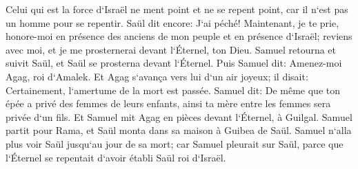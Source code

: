 \verse Celui qui est la force d`Israël ne ment point et ne se repent point, car il n`est pas un homme pour se repentir. 
\verse Saül dit encore: J`ai péché! Maintenant, je te prie, honore-moi en présence des anciens de mon peuple et en présence d`Israël; reviens avec moi, et je me prosternerai devant l`Éternel, ton Dieu. 
\verse Samuel retourna et suivit Saül, et Saül se prosterna devant l`Éternel. 
\verse Puis Samuel dit: Amenez-moi Agag, roi d`Amalek. Et Agag s`avança vers lui d`un air joyeux; il disait: Certainement, l`amertume de la mort est passée. 
\verse Samuel dit: De même que ton épée a privé des femmes de leurs enfants, ainsi ta mère entre les femmes sera privée d`un fils. Et Samuel mit Agag en pièces devant l`Éternel, à Guilgal. 
\verse Samuel partit pour Rama, et Saül monta dans sa maison à Guibea de Saül. 
\verse Samuel n`alla plus voir Saül jusqu`au jour de sa mort; car Samuel pleurait sur Saül, parce que l`Éternel se repentait d`avoir établi Saül roi d`Israël. 

